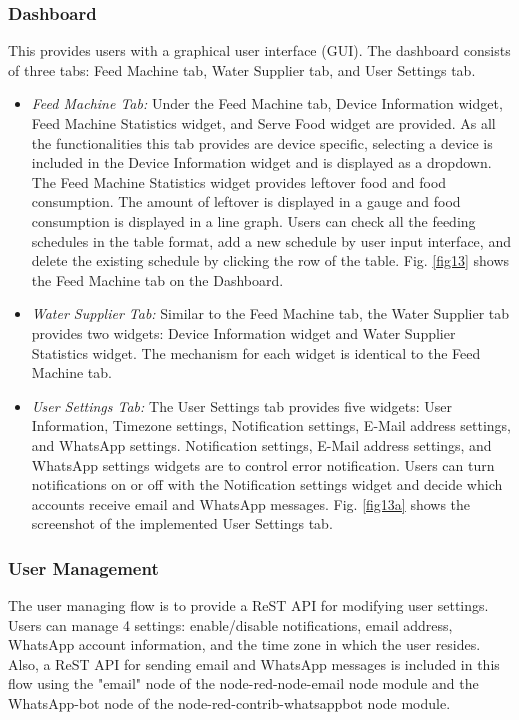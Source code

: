 \documentclass[conference]{IEEEtran}
\begin{document}

\subsubsection{Dashboard}
This provides users with a graphical user interface (GUI). The dashboard consists of three tabs: Feed Machine tab, Water Supplier tab, and User Settings tab.

\begin{itemize}
\item{\it{Feed Machine Tab:}}
Under the Feed Machine tab, Device Information widget, Feed Machine Statistics widget, and Serve Food widget are provided. 
As all the functionalities this tab provides are device specific, selecting a device is included in the Device Information widget and is displayed as a dropdown.
The Feed Machine Statistics widget provides leftover food and food consumption. The amount of leftover is displayed in a gauge and food consumption is displayed in a line graph. Users can check all the feeding schedules in the table format, add a new schedule by user input interface, and delete the existing schedule by clicking the row of the table. Fig. \ref{fig13} shows the Feed Machine tab on the Dashboard.
\item{\it{Water Supplier Tab:}}
Similar to the Feed Machine tab, the Water Supplier tab provides two widgets: Device Information widget and Water Supplier Statistics widget. The mechanism for each widget is identical to the Feed Machine tab. 
\item{\it{User Settings Tab:}}
The User Settings tab provides five widgets: User Information, Timezone settings, Notification settings, E-Mail address settings, and WhatsApp settings. 
Notification settings, E-Mail address settings, and WhatsApp settings widgets are to control error notification. Users can turn notifications on or off with the Notification settings widget and decide which accounts receive email and WhatsApp messages. Fig. \ref{fig13a} shows the screenshot of the implemented User Settings tab.
\end{itemize}

\subsubsection{User Management}
The user managing flow is to provide a ReST API for modifying user settings.
Users can manage 4 settings: enable/disable notifications, email address, WhatsApp account information, and the time zone in which the user resides.
Also, a ReST API for sending email and WhatsApp messages is included in this flow using the "email" node of the node-red-node-email node module and the WhatsApp-bot node of the node-red-contrib-whatsappbot node module.
\end{document}
